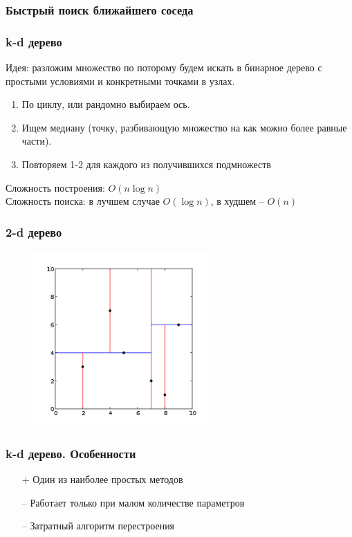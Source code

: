 \documentclass[12pt]{beamer}
\begin{document}
\begin{frame}\frametitle{Быстрый поиск ближайшего соседа}
\end{frame}

\begin{frame}\frametitle{k-d дерево}
Идея: разложим множество по поторому будем искать
в бинарное дерево с простыми условиями и
конкретными точками в узлах.
\vspace{5mm}
\begin{enumerate}
\item По циклу, или рандомно выбираем ось.
\item Ищем медиану (точку, разбивающую множество на как
можно более равные части).
\item Повторяем 1-2 для каждого из получившихся подмножеств 
\end{enumerate}
Сложность построения: $O(n\log n)$\\
Сложность поиска: в лучшем
случае $O(\log n)$, в худшем -- $O(n)$
\end{frame}
\begin{frame}\frametitle{2-d дерево}

\begin{figure}[htbp]
\centering
\includegraphics[height=190pt]{images/Kdtree_2d}  
\end{figure}
\end{frame}

\begin{frame}\frametitle{k-d дерево. Особенности}
\begin{itemize}
\item[+] Один из наиболее простых методов
\item[--] Работает только при малом количестве параметров
\item[--] Затратный алгоритм перестроения

\end{itemize}
\end{frame}
\end{document}
